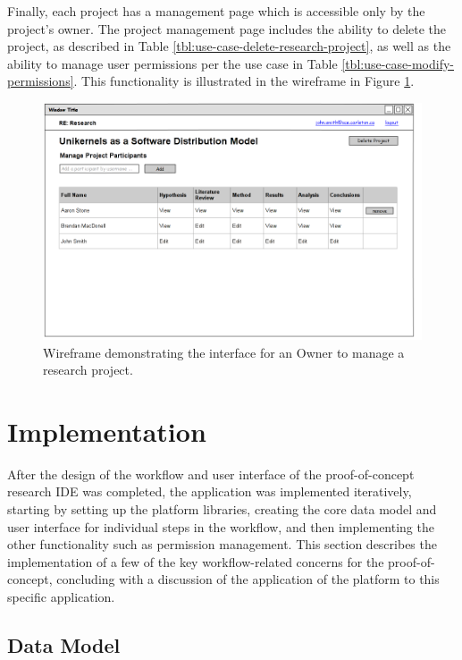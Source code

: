 \documentclass[document.tex]{subfiles}
\begin{document}
Finally, each project has a management page which is accessible only by the project's owner.
The project management page includes the ability to delete the project, as described in Table \ref{tbl:use-case-delete-research-project}, as well as the ability to manage user permissions per the use case in Table \ref{tbl:use-case-modify-permissions}.
This functionality is illustrated in the wireframe in Figure \ref{fig:case-research-design-manage-project}.

\begin{figure}[!ht]
\centering \includegraphics[width=5.5in]{./img/case-study-research-railgun/mockup-manage-project}
\caption{Wireframe demonstrating the interface for an Owner to manage a research project.}
\label{fig:case-research-design-manage-project}
\end{figure}


\FloatBarrier

\section {Implementation}

After the design of the workflow and user interface of the proof-of-concept research IDE was completed, the application was implemented iteratively, starting by setting up the platform libraries, creating the core data model and user interface for individual steps in the workflow, and then implementing the other functionality such as permission management. This section describes the implementation of a few of the key workflow-related concerns for the proof-of-concept, concluding with a discussion of the application of the platform to this specific application.


\subsection {Data Model}
\end{document}
